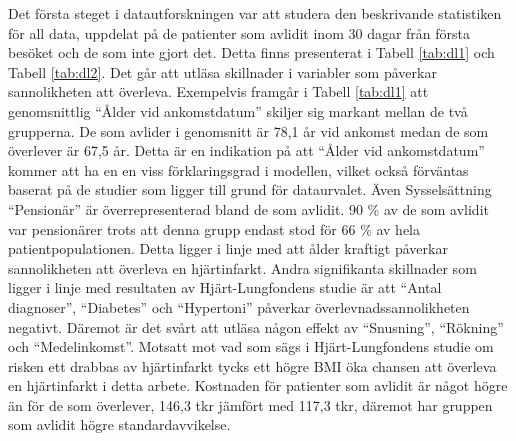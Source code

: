 Det första steget i datautforskningen var att studera den beskrivande statistiken för all data, uppdelat på de patienter som avlidit inom 30 dagar från första besöket och de som inte gjort det. Detta finns presenterat i Tabell \ref{tab:dl1} och Tabell \ref{tab:dl2}. Det går att utläsa skillnader i variabler som påverkar sannolikheten att överleva. Exempelvis framgår i Tabell \ref{tab:dl1} att genomsnittlig “Ålder vid ankomstdatum” skiljer sig markant mellan de två grupperna. De som avlider i genomsnitt är 78,1 år vid ankomst medan de som överlever är 67,5 år. Detta är en indikation på att “Ålder vid ankomstdatum” kommer att ha en en viss förklaringsgrad i modellen, vilket också förväntas baserat på de studier som ligger till grund för dataurvalet. Även Sysselsättning “Pensionär” är överrepresenterad bland de som avlidit. 90 \% av de som avlidit var pensionärer trots att denna grupp endast stod för 66 \% av hela patientpopulationen. Detta ligger i linje med att ålder kraftigt påverkar sannolikheten att överleva en hjärtinfarkt. Andra signifikanta skillnader som ligger i linje med resultaten av Hjärt-Lungfondens studie är att “Antal diagnoser”, “Diabetes” och “Hypertoni” påverkar överlevnadssannolikheten negativt. Däremot är det svårt att utläsa någon effekt av “Snusning”, “Rökning” och “Medelinkomst”. Motsatt mot vad som sägs i Hjärt-Lungfondens studie om risken ett drabbas av hjärtinfarkt tycks ett högre BMI öka chansen att överleva en hjärtinfarkt i detta arbete. Kostnaden för patienter som avlidit är något högre än för de som överlever, 146,3 tkr jämfört med 117,3 tkr, däremot har gruppen som avlidit högre standardavvikelse.


